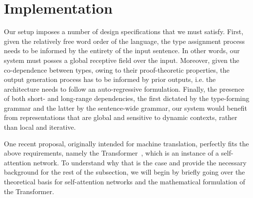 \section{Implementation}
Our setup imposes a number of design specifications that we must satisfy.
First, given the relatively free word order of the language, the type assignment process needs to be informed by the entirety of the input sentence.
In other words, our system must posses a global receptive field over the input.
Moreover, given the co-dependence between types, owing to their proof-theoretic properties, the output generation process has to be informed by prior outputs, i.e. the architecture needs to follow an auto-regressive formulation.
Finally, the presence of both short- and long-range dependencies, the first dictated by the type-forming grammar and the latter by the sentence-wide grammar, our system would benefit from representations that are global and sensitive to dynamic contexts, rather than local and iterative.

One recent proposal, originally intended for machine translation, perfectly fits the above requirements, namely the Transformer~\cite{vaswani2017attention}, which is an instance of a self-attention network.
To understand why that is the case and provide the necessary background for the rest of the subsection, we will begin by briefly going over the theoretical basis for self-attention networks and the mathematical formulation of the Transformer.

